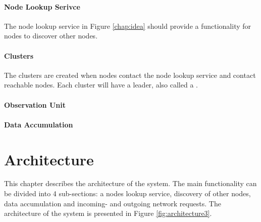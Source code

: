 \documentclass[USenglish]{uit-thesis}
\begin{document}
\subsubsection{Node Lookup Serivce}
The node lookup service in Figure \ref{chap:idea} should provide a functionality for nodes to discover other nodes.

\subsubsection{Clusters}
The clusters are created when nodes contact the node lookup service and contact reachable nodes. Each cluster will have a leader, also called a .

\subsubsection{Observation Unit}


\subsubsection{Data Accumulation}




\chapter{Architecture}

This chapter describes the architecture of the system. The main functionality can be divided into 4 sub-sections: a nodes lookup service, discovery of other nodes, data accumulation and incoming- and outgoing network requests. The architecture of the system is presented in Figure \ref{fig:architecture3}.
\end{document}
